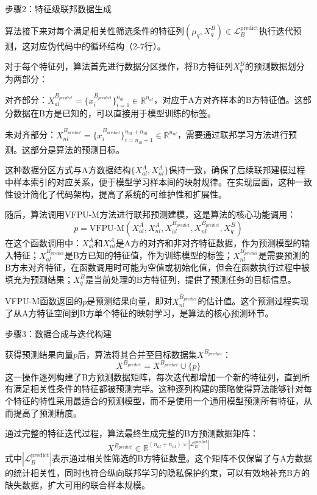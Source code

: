 步骤2：特征级联邦数据生成

算法接下来对每个满足相关性筛选条件的特征列$(\mu_q, X^B_q) \in \mathcal{L}_B^{\text{predict}}$执行迭代预测，这对应伪代码中的循环结构（2-7行）。

对于每个特征列，算法首先进行数据分区操作，将B方特征列$X^B_q$的预测数据划分为两部分：

对齐部分：$X_{al}^{B_{predict}} = \{x_{i}^{B_{predict}}\}_{i=1}^{n_{al}} \in \mathbb{R}^{n_{al}}$，对应于A方对齐样本的B方特征值。这部分数据在B方是已知的，可以直接用于模型训练的标签。

未对齐部分：$X_{nl}^{B_{predict}} = \{x_{i}^{B_{predict}}\}_{i=n_{al}+1}^{n_{al}+n_{nl}} \in \mathbb{R}^{n_{nl}}$，需要通过联邦学习方法进行预测。这部分是算法的预测目标。

这种数据分区方式与A方数据结构$\{X_{al}^A, X_{nl}^A\}$保持一致，确保了后续联邦建模过程中样本索引的对应关系，便于模型学习样本间的映射规律。在实现层面，这种一致性设计简化了代码架构，提高了系统的可维护性和扩展性。

随后，算法调用VFPU-M方法进行联邦预测建模，这是算法的核心功能调用：
\begin{equation}
	p = \text{VFPU-M}(X_{al}^A, X_{nl}^A, X_{al}^{B_{predict}}, X_{nl}^{B_{predict}}, X^B_q)
\end{equation}
在这个函数调用中：$X_{al}^A$和$X_{nl}^A$是A方的对齐和非对齐特征数据，作为预测模型的输入特征；$X_{al}^{B_{predict}}$是B方已知的特征值，作为训练模型的标签；$X_{nl}^{B_{predict}}$是需要预测的B方未对齐特征，在函数调用时可能为空值或初始化值，但会在函数执行过程中被填充为预测结果；$X^B_q$是当前处理的B方特征列，提供了预测任务的目标信息。

VFPU-M函数返回的$p$是预测结果向量，即对$X_{nl}^{B_{predict}}$的估计值。这个预测过程实现了从A方特征空间到B方单个特征的映射学习，是算法的核心预测环节。

步骤3：数据合成与迭代构建

获得预测结果向量$p$后，算法将其合并至目标数据集$X^{B_{predict}}$：
\begin{equation}
	X^{B_{predict}} = X^{B_{predict}} \cup \{p\}
\end{equation}
这一操作逐列构建了B方预测数据矩阵，每次迭代都增加一个新的特征列，直到所有满足相关性条件的特征都被预测完毕。这种逐列构建的策略使得算法能够针对每个特征的特性采用最适合的预测模型，而不是使用一个通用模型预测所有特征，从而提高了预测精度。

通过完整的特征迭代过程，算法最终生成完整的B方预测数据矩阵：
\begin{equation}
	X^{B_{predict}} \in \mathbb{R}^{(n_{al}+n_{nl}) \times |\mathcal{L}_B^{\text{predict}}|}
\end{equation}
式中$|\mathcal{L}_B^{\text{predict}}|$表示通过相关性筛选的B方特征数量。这个矩阵不仅保留了与A方数据的统计相关性，同时也符合纵向联邦学习的隐私保护约束，可以有效地补充B方的缺失数据，扩大可用的联合样本规模。

